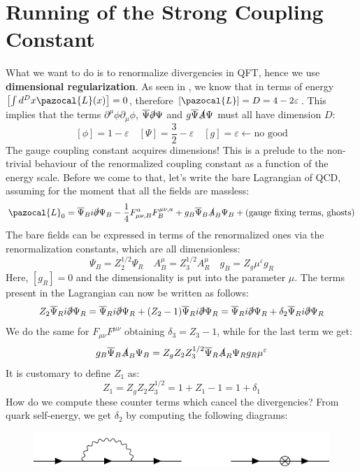 \documentclass[../main.tex]{subfiles}
\begin{document}
\section{Running of the Strong Coupling Constant}
What we want to do is to renormalize divergencies in QFT, hence we use \textbf{dimensional regularization}. As seen in , we know that in terms of energy $\left[\int d^Dx\pazocal{L}(x)\right]=0$, therefore $\left[\pazocal{L}\right]=D=4-2\varepsilon$. This implies that the terms $\partial^\mu\phi\partial_\mu\phi$, $\overline{\Psi}\slashed{\partial}\Psi$ and $g\overline{\Psi}\slashed{A}\Psi$ must all have dimension $D$:
\[
\left[\phi\right]=1-\varepsilon \quad \left[\Psi\right]=\frac{3}{2}-\varepsilon \quad \left[g\right]=\varepsilon\xleftarrow[]{}\text{no good}
\]
The gauge coupling constant acquires dimensions! This is a prelude to the non-trivial behaviour of the renormalized coupling constant as a function of the energy scale. Before we come to that, let's write the bare Lagrangian of QCD, assuming for the moment that all the fields are massless:
\[
\pazocal{L}_0=\overline{\Psi}_Bi\slashed{\partial}\Psi_B-\frac{1}{4}F_{\mu\nu,B}^aF^{\mu\nu,a}_B+g_B\overline{\Psi}_B\slashed{A}_B\Psi_B+\text{(gauge fixing terms, ghosts)}
\]
The bare fields can be expressed in terms of the renormalized ones via the renormalization constants, which are all dimensionless:
\[
\Psi_B=Z_2^{1/2}\Psi_R \quad A^\mu_B=Z_3^{1/2}A^\mu_R \quad g_B=Z_g\mu^\varepsilon g_R
\]
Here, $[g_R]=0$ and the dimensionality is put into the parameter $\mu$. The terms present in the Lagrangian can now be written as follows:
\[
Z_2\overline{\Psi}_Ri\slashed{\partial}\Psi_R=\overline{\Psi}_Ri\slashed{\partial}\Psi_R+(Z_2-1)\overline{\Psi}_Ri\slashed{\partial}\Psi_R=\overline{\Psi}_Ri\slashed{\partial}\Psi_R+\delta_2\overline{\Psi}_Ri\slashed{\partial}\Psi_R
\]
We do the same for $F_{\mu\nu}F^{\mu\nu}$ obtaining $\delta_3=Z_3-1$, while for the last term we get:
\[
g_B\overline{\Psi}_B\slashed{A}_B\Psi_B=Z_gZ_2Z_3^{1/2}\overline{\Psi}_R\slashed{A}_R\Psi_Rg_R\mu^\varepsilon
\]
It is customary to define $Z_1$ as:
\[
Z_1=Z_gZ_2Z_3^{1/2}=1+Z_1-1=1+\delta_1
\]
How do we compute these counter terms which cancel the divergencies? From quark self-energy, we get $\delta_2$ by computing the following diagrams:\\
\begin{figure}[h]
    \centering
    \includegraphics{Images/delta2.pdf}
    \caption*{}
\end{figure}\\
\end{document}
